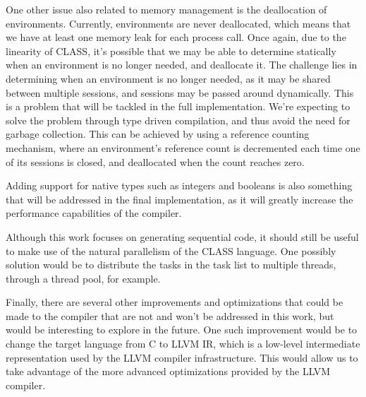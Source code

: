 One other issue also related to memory management is the deallocation of environments. Currently, environments are never deallocated, which means that we have at least one memory leak for each process call. Once again, due to the linearity of CLASS, it's possible that we may be able to determine statically when an environment is no longer needed, and deallocate it. The challenge lies in determining when an environment is no longer needed, as it may be shared between multiple sessions, and sessions may be passed around dynamically. This is a problem that will be tackled in the full implementation. We're expecting to solve the problem through type driven compilation, and thus avoid the need for garbage collection. This can be achieved by using a reference counting mechanism, where an environment's reference count is decremented each time one of its sessions is closed, and deallocated when the count reaches zero.

Adding support for native types such as integers and booleans is also something that will be addressed in the final implementation, as it will greatly increase the performance capabilities of the compiler.

Although this work focuses on generating sequential code, it should still be useful to make use of the natural parallelism of the CLASS language. One possibly solution would be to distribute the tasks in the task list to multiple threads, through a thread pool, for example.

Finally, there are several other improvements and optimizations that could be made to the compiler that are not and won't be addressed in this work, but would be interesting to explore in the future. One such improvement would be to change the target language from C to LLVM IR, which is a low-level intermediate representation used by the LLVM compiler infrastructure. This would allow us to take advantage of the more advanced optimizations provided by the LLVM compiler.
